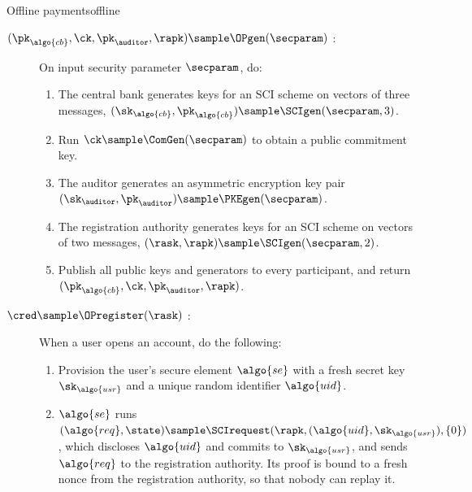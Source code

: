 \begin{protocolbox}{Offline payments}{offline}

  \begin{description}

    \item[$(\pk_{\algo{cb}}, \ck, \pk_\auditor, \rapk) \sample
      \OPgen(\secparam)$ :] On input security parameter $\secparam$, do:

      \begin{enumerate}

        \item The central bank generates keys for an SCI scheme on vectors of
          three messages, $(\sk_{\algo{cb}}, \pk_{\algo{cb}}) \sample
          \SCIgen(\secparam, 3)$.

        \item Run $\ck \sample \ComGen(\secparam)$ to obtain a public
          commitment key.

        \item The auditor generates an asymmetric encryption key pair
          $(\sk_\auditor, \pk_\auditor) \sample \PKEgen(\secparam)$.

        \item The registration authority generates keys for an SCI scheme on
          vectors of two messages, $(\rask, \rapk) \sample \SCIgen(\secparam,
          2)$.

        \item Publish all public keys and generators to every participant, and
          return $(\pk_{\algo{cb}}, \ck, \pk_\auditor, \rapk)$.

      \end{enumerate}

    \item[$\cred \sample \OPregister(\rask)$ :] When a user opens an account,
      do the following:

      \begin{enumerate}

        \item Provision the user's secure element $\algo{se}$ with a fresh
          secret key $\sk_{\algo{usr}}$ and a unique random identifier
          $\algo{uid}$.

        \item $\algo{se}$ runs $(\algo{req}, \state) \sample \SCIrequest(\rapk,
          (\algo{uid}, \sk_{\algo{usr}}), \{0\})$, which discloses $\algo{uid}$
          and commits to $\sk_{\algo{usr}}$, and sends $\algo{req}$ to the
          registration authority. Its proof is bound to a fresh nonce from the
          registration authority, so that nobody can replay it.


\end{enumerate}
\end{description}
\end{protocolbox}
